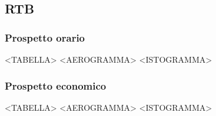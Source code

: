 \subsection{RTB}

\subsubsection{Prospetto orario}

<TABELLA>
<AEROGRAMMA>
<ISTOGRAMMA>

\subsubsection{Prospetto economico}

<TABELLA>
<AEROGRAMMA>
<ISTOGRAMMA>

